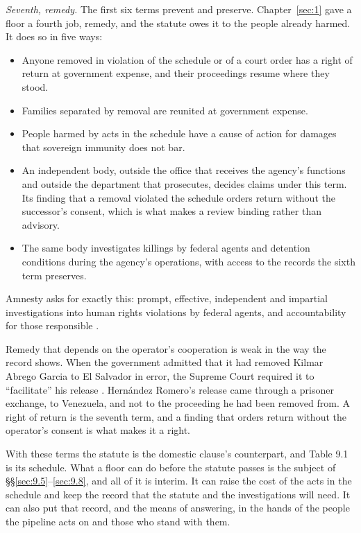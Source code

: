 \emph{Seventh, remedy.} The first six terms prevent and preserve. Chapter~\ref{sec:1} gave a floor a fourth job, remedy, and the statute owes it to the people already harmed. It does so in five ways:

\begin{itemize}
\item Anyone removed in violation of the schedule or of a court order has a right of return at government expense, and their proceedings resume where they stood.
\item Families separated by removal are reunited at government expense.
\item People harmed by acts in the schedule have a cause of action for damages that sovereign immunity does not bar.
\item An independent body, outside the office that receives the agency's functions and outside the department that prosecutes, decides claims under this term. Its finding that a removal violated the schedule orders return without the successor's consent, which is what makes a review binding rather than advisory.
\item The same body investigates killings by federal agents and detention conditions during the agency's operations, with access to the records the sixth term preserves.
\end{itemize}

Amnesty asks for exactly this: prompt, effective, independent and impartial investigations into human rights violations by federal agents, and accountability for those responsible \autocite{Amnesty2026Whistles}.

Remedy that depends on the operator's cooperation is weak in the way the record shows. When the government admitted that it had removed Kilmar Abrego Garcia to El Salvador in error, the Supreme Court required it to “facilitate” his release \autocite{abregogarcia2025}. Hernández Romero's release came through a prisoner exchange, to Venezuela, and not to the proceeding he had been removed from. A right of return is the seventh term, and a finding that orders return without the operator's consent is what makes it a right.

With these terms the statute is the domestic clause's counterpart, and Table 9.1 is its schedule. What a floor can do before the statute passes is the subject of \S\S\ref{sec:9.5}–\ref{sec:9.8}, and all of it is interim. It can raise the cost of the acts in the schedule and keep the record that the statute and the investigations will need. It can also put that record, and the means of answering, in the hands of the people the pipeline acts on and those who stand with them.

